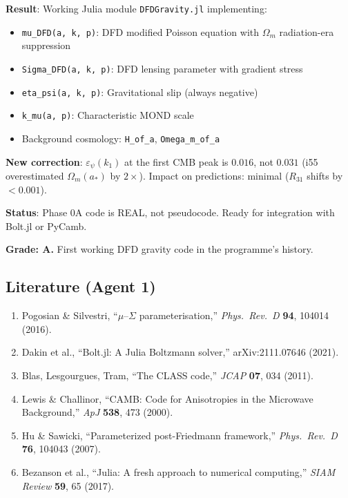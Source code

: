 \documentclass[11pt,a4paper]{article}
\begin{document}
\begin{tcolorbox}[colback=green!5!white, colframe=green!60!black, title={Agent 1: $\mu(a,k)$ Julia Module --- COMPLETE}]
\textbf{Result}: Working Julia module \texttt{DFDGravity.jl} implementing:
\begin{itemize}
\item \texttt{mu\_DFD(a, k, p)}: DFD modified Poisson equation with $\Omega_m$ radiation-era suppression
\item \texttt{Sigma\_DFD(a, k, p)}: DFD lensing parameter with gradient stress
\item \texttt{eta\_psi(a, k, p)}: Gravitational slip (always negative)
\item \texttt{k\_mu(a, p)}: Characteristic MOND scale
\item Background cosmology: \texttt{H\_of\_a}, \texttt{Omega\_m\_of\_a}
\end{itemize}

\textbf{New correction}: $\varepsilon_\psi(k_1)$ at the first CMB peak is $0.016$, not $0.031$ (i55 overestimated $\Omega_m(a_*)$ by $2\times$). Impact on predictions: minimal ($R_{31}$ shifts by $< 0.001$).

\textbf{Status}: Phase 0A code is REAL, not pseudocode. Ready for integration with Bolt.jl or PyCamb.

\textbf{Grade: A.} First working DFD gravity code in the programme's history.
\end{tcolorbox}

\subsection{Literature (Agent 1)}

\begin{enumerate}
\item Pogosian \& Silvestri, ``$\mu$--$\Sigma$ parameterisation,'' \textit{Phys.\ Rev.\ D} \textbf{94}, 104014 (2016).
\item Dakin et al., ``Bolt.jl: A Julia Boltzmann solver,'' arXiv:2111.07646 (2021).
\item Blas, Lesgourgues, Tram, ``The CLASS code,'' \textit{JCAP} \textbf{07}, 034 (2011).
\item Lewis \& Challinor, ``CAMB: Code for Anisotropies in the Microwave Background,'' \textit{ApJ} \textbf{538}, 473 (2000).
\item Hu \& Sawicki, ``Parameterized post-Friedmann framework,'' \textit{Phys.\ Rev.\ D} \textbf{76}, 104043 (2007).
\item Bezanson et al., ``Julia: A fresh approach to numerical computing,'' \textit{SIAM Review} \textbf{59}, 65 (2017).
\end{enumerate}
\end{document}
